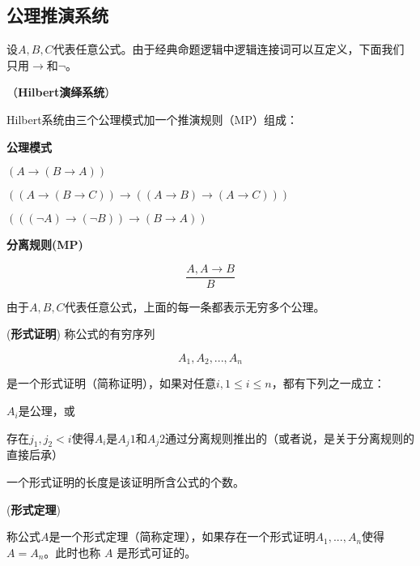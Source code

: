 \subsection{公理推演系统}

设$A, B, C$代表任意公式。由于经典命题逻辑中逻辑连接词可以互定义，下面我们只用$\to$和$\neg$。

\begin{defn}（\textbf{Hilbert演绎系统}）

Hilbert系统由三个公理模式加一个推演规则（MP）组成：

\textbf{公理模式}

\begin{tightenum}
  \item $(A \to (B \to A))$
  \item $((A \to (B \to C)) \to ((A \to B) \to (A \to C)))$
  \item $(((\neg A) \to (\neg B)) \to (B \to A))$
\end{tightenum}


\textbf{分离规则(MP)}

$$\frac {A, A \to B } {B} $$

\end{defn}





\begin{rem}
由于$A,B,C$代表任意公式，上面的每一条都表示无穷多个公理。
\end{rem}


\begin{defn}(\textbf{形式证明}) 称公式的有穷序列

$$A_1, A_2, ... , A_n$$

是一个形式证明（简称证明），如果对任意$i, 1 \leq i \leq n$，都有下列之一成立：
\begin{tightenum}
 \item $A_i$是公理，或
 \item 存在$j_1, j_2 < i$使得$A_i$是$A_j1$和$A_j2$通过分离规则推出的（或者说，是关于分离规则的直接后承）
\end{tightenum}
\end{defn}

一个形式证明的长度是该证明所含公式的个数。



\begin{defn} (\textbf{形式定理})

称公式$A$是一个形式定理（简称定理），如果存在一个形式证明$A_1, ..., A_n$使得$A = A_n$。此时也称
$A$ 是形式可证的。

\end{defn}


